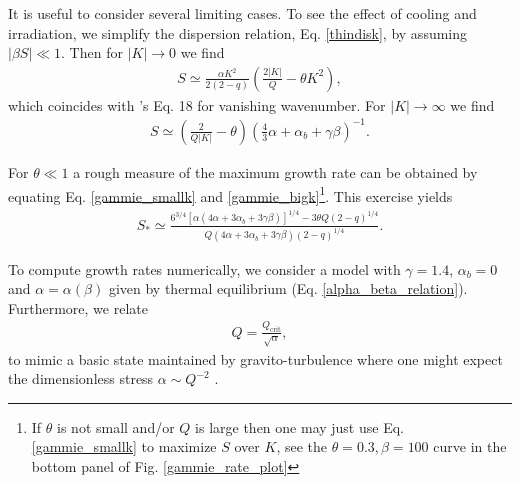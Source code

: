It is useful to consider several limiting cases.
To see the effect of cooling and irradiation, we simplify the
dispersion relation, Eq. \ref{thindisk}, by assuming $|\beta S|\ll
1$. Then for $|K| \to 0$ we find
\begin{align}\label{gammie_smallk}
  S\simeq \frac{\alpha K^2}{2(2-q)}\left(\frac{2|K|}{Q} - \theta
  K^2\right), 
\end{align}
which coincides with \citeauthor{gammie96}'s Eq. 18 for vanishing
wavenumber. For $|K|\to\infty$ we find
\begin{align}\label{gammie_bigk}
  S \simeq\left(\frac{2}{Q|K|} - \theta\right)\left(\frac{4}{3}\alpha + 
  \alpha_b + \gamma\beta\right)^{-1}.
\end{align}

For $\theta\ll1$ a rough measure of the maximum growth rate can be obtained by
equating Eq. \ref{gammie_smallk} and \ref{gammie_bigk}\footnote{If
  $\theta$ is not small and/or $Q$  is large then one may just use Eq. \ref{gammie_smallk}
  to maximize $S$ over $K$, see the $\theta=0.3,\beta=100$ curve in the bottom
  panel of Fig. \ref{gammie_rate_plot}}.  
This exercise yields 
\begin{align}\label{gammie_maxrate_simple}
  S_*\simeq \frac{
    6^{3/4}\left[\alpha\left(4\alpha +
      3\alpha_b + 3\gamma\beta\right)\right]^{1/4} - 3\theta
    Q(2-q)^{1/4}}{Q\left(4\alpha + 3\alpha_b +
    3\gamma\beta\right)(2-q)^{1/4}}. 
\end{align} 


To compute growth rates numerically, 
we consider a model with $\gamma=1.4$, $\alpha_b=0$ and 
$\alpha=\alpha(\beta)$ given by thermal equilibrium
(Eq. \ref{alpha_beta_relation}). Furthermore, we relate   
\begin{align}
  Q = \frac{Q_\mathrm{crit}}{\sqrt{\alpha}},\label{Qalpha}
\end{align}
to mimic a basic state maintained by gravito-turbulence where one
might expect the dimensionless stress $\alpha \sim Q^{-2}$
\citep{lin87}.   

